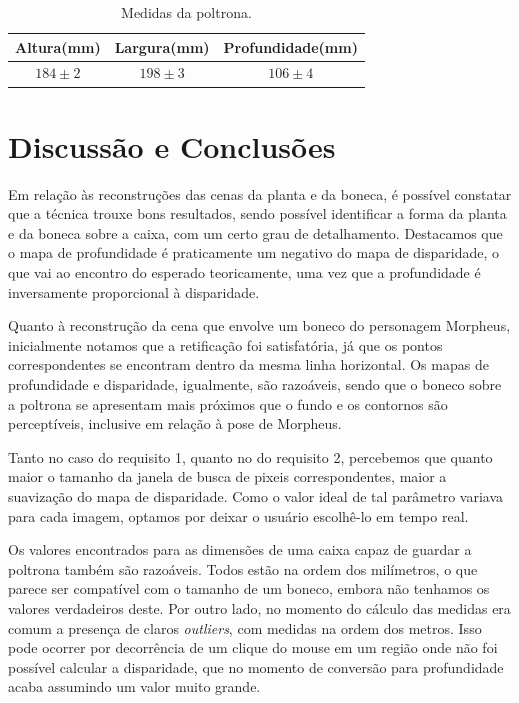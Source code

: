 \documentclass{bmvc2k}
\begin{document}
\begin{table}[htb]
 \footnotesize
\caption{Medidas da poltrona.}
\label{table:measures}
\centering
\begin{tabular}{| c | c | c |}
\hline
 Altura(mm) & Largura(mm) & Profundidade(mm)\\
\hline
$184 \pm 2$ & $198 \pm 3$ & $106 \pm 4$\\
\hline

\hline
\end{tabular}
\end{table}

\section{Discussão e Conclusões}
Em relação às reconstruções das cenas da planta e da boneca, é possível constatar que a técnica trouxe bons resultados, sendo possível identificar a forma da planta e da boneca sobre a caixa, com um certo grau de detalhamento. Destacamos que o mapa de profundidade é praticamente um negativo do mapa de disparidade, o que vai ao encontro do esperado teoricamente, uma vez que a profundidade é inversamente proporcional à disparidade.

Quanto à reconstrução da cena que envolve um boneco do personagem Morpheus, inicialmente notamos que a retificação foi satisfatória, já que os pontos correspondentes se encontram dentro da mesma linha horizontal. Os mapas de profundidade e disparidade, igualmente, são razoáveis, sendo que o boneco sobre a poltrona se apresentam mais próximos que o fundo e os contornos são perceptíveis, inclusive em relação à pose de Morpheus.

Tanto no caso do requisito 1, quanto no do requisito 2, percebemos que quanto maior o tamanho da janela de busca de pixeis correspondentes, maior a suavização do mapa de disparidade. Como o valor ideal de tal parâmetro variava para cada imagem, optamos por deixar o usuário escolhê-lo em tempo real.

Os valores encontrados para as dimensões de uma caixa capaz de guardar a poltrona também são razoáveis. Todos estão na ordem dos milímetros, o que parece ser compatível com o tamanho de um boneco, embora não tenhamos os valores verdadeiros deste. Por outro lado, no momento do cálculo das medidas era comum a presença de claros \textit{outliers}, com medidas na ordem dos metros. Isso pode ocorrer por decorrência de um clique do mouse em um região onde não foi possível calcular a disparidade, que no momento de conversão para profundidade acaba assumindo um valor muito grande.
\end{document}

